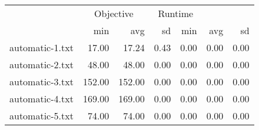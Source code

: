 \begin{tabular}{l|rrr|rrr|}
  \toprule   & \multicolumn{2}{c}{Objective} & \multicolumn{2}{c}{Runtime} \\ & min & avg & sd & min & avg & sd \\ 
  \midrule automatic-1.txt & 17.00 & 17.24 & 0.43 & 0.00 & 0.00 & 0.00 \\ 
  automatic-2.txt & 48.00 & 48.00 & 0.00 & 0.00 & 0.00 & 0.00 \\ 
  automatic-3.txt & 152.00 & 152.00 & 0.00 & 0.00 & 0.00 & 0.00 \\ 
  automatic-4.txt & 169.00 & 169.00 & 0.00 & 0.00 & 0.00 & 0.00 \\ 
  automatic-5.txt & 74.00 & 74.00 & 0.00 & 0.00 & 0.00 & 0.00 \\ 
   \bottomrule \end{tabular}
